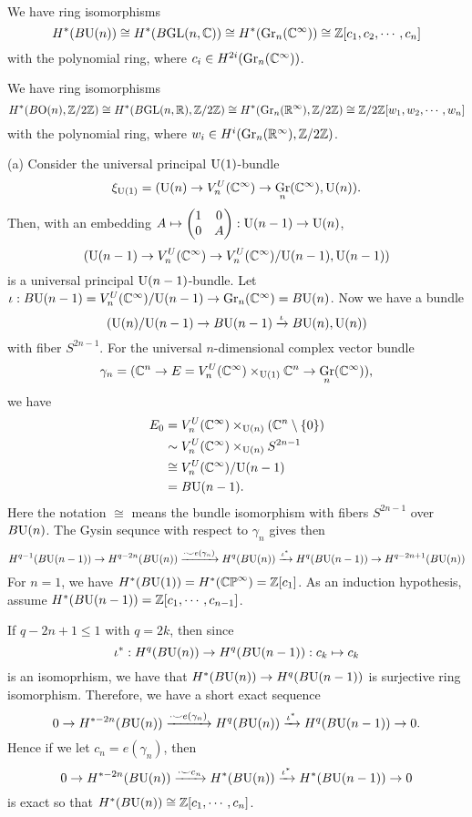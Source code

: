 \documentclass{../../../small}
\DeclareMathOperator{\Gr}{Gr}
\begin{document}
\begin{thm*}\,
\begin{parts}
\item We have ring isomorphisms
\[H^*(B\mathrm{U}(n))\cong H^*(B\mathrm{GL}(n,\mathbb{C}))\cong H^*(\mathrm{Gr}_n(\mathbb{C}^\infty))\cong\mathbb{Z}[c_1,c_2,\cdots,c_n]\]
with the polynomial ring, where $c_i\in H^{2i}(\mathrm{Gr}_n(\mathbb{C}^\infty))$.
\item We have ring isomorphisms
\[H^*(B\mathrm{O}(n),\mathbb{Z}/2\mathbb{Z})\cong H^*(B\mathrm{GL}(n,\mathbb{R}),\mathbb{Z}/2\mathbb{Z})\cong H^*(\mathrm{Gr}_n(\mathbb{R}^\infty),\mathbb{Z}/2\mathbb{Z})\cong\mathbb{Z}/2\mathbb{Z}[w_1,w_2,\cdots,w_n]\]
with the polynomial ring, where $w_i\in H^{i}(\mathrm{Gr}_n(\mathbb{R}^\infty),\mathbb{Z}/2\mathbb{Z})$.
\end{parts}
\end{thm*}
\begin{pf}
(a)
Consider the universal principal $\mathrm{U}(1)$-bundle
\[\xi_{\rU(1)}=(\rU(n)\to V_n^U(\C^\infty)\to\Gr_n(\C^\infty),\rU(n)).\]
Then, with an embedding $A\mapsto\begin{pmatrix}1&0\\0&A\end{pmatrix}:\mathrm{U}(n-1)\to\mathrm{U}(n)$,
\[(\mathrm{U}(n-1)\to V_n^U(\mathbb{C}^\infty)\to V_n^U(\mathbb{C}^\infty)/\mathrm{U}(n-1),\mathrm{U}(n-1))\]
is a universal principal $\mathrm{U}(n-1)$-bundle.
Let $\iota:B\rU(n-1)=V_n^U(\C^\infty)/\rU(n-1)\to\Gr_n(\C^\infty)=B\rU(n)$.
Now we have a bundle
\[(\mathrm{U}(n)/\mathrm{U}(n-1)\to B\mathrm{U}(n-1)\xrightarrow{\iota}B\mathrm{U}(n),\mathrm{U}(n))\]
with fiber $S^{2n-1}$.
For the universal $n$-dimensional complex vector bundle
\[\gamma_n=(\C^n\to E=V_n^U(\C^\infty)\times_{\rU(1)}\C^n\to\Gr_n(\C^\infty)),\]
we have
\begin{align*}
E_0
&=V_n^U(\mathbb{C}^\infty)\times_{\mathrm{U}(n)}(\mathbb{C}^n\setminus\{0\})\\
&\sim V_n^U(\mathbb{C}^\infty)\times_{\mathrm{U}(n)}S^{2n-1}\\
&\cong V_n^U(\mathbb{C}^\infty)/\mathrm{U}(n-1)\\
&=B\mathrm{U}(n-1).
\end{align*}
Here the notation $\cong$ means the bundle isomorphism with fibers $S^{2n-1}$ over $B\mathrm{U}(n)$.
The Gysin sequnce with respect to $\gamma_n$ gives then
\[H^{q-1}(B\mathrm{U}(n-1))\to H^{q-2n}(B\mathrm{U}(n))\xrightarrow{\cdot\smile e(\gamma_n)}H^q(B\mathrm{U}(n))\xrightarrow{\iota^*}H^q(B\mathrm{U}(n-1))\to H^{q-2n+1}(B\mathrm{U}(n))\]
For $n=1$, we have $H^*(B\mathrm{U}(1))=H^*(\mathbb{CP}^\infty)=\mathbb{Z}[c_1]$.
As an induction hypothesis, assume $H^*(B\mathrm{U}(n-1))=\mathbb{Z}[c_1,\cdots,c_{n-1}]$.

If $q-2n+1\le1$ with $q=2k$, then since
\[\iota^*:H^q(B\mathrm{U}(n))\to H^q(B\mathrm{U}(n-1)):c_k\mapsto c_k\]
is an isomoprhism, we have that $H^*(B\mathrm{U}(n))\to H^q(B\mathrm{U}(n-1))$ is surjective ring isomorphism.
Therefore, we have a short exact sequence
\[0\to H^{*-2n}(B\mathrm{U}(n))\xrightarrow{\cdot\smile e(\gamma_n)}H^q(B\mathrm{U}(n))\xrightarrow{\iota^*}H^q(B\mathrm{U}(n-1))\to0.\]
Hence if we let $c_n=e(\gamma_n)$, then
\[0\to H^{*-2n}(B\mathrm{U}(n))\xrightarrow{\cdot\smile c_n}H^*(B\mathrm{U}(n))\xrightarrow{\iota^*}H^*(B\mathrm{U}(n-1))\to0\]
is exact so that $H^*(B\mathrm{U}(n))\cong\mathbb{Z}[c_1,\cdots,c_n]$.
\end{pf}
\end{document}
